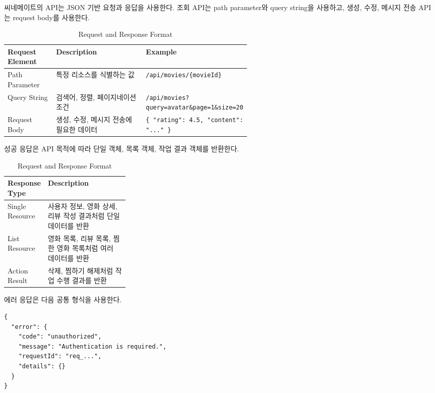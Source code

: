 \documentclass[11pt,a4paper]{article}
\renewcommand{\arraystretch}{1.18}
\begin{document}
씨네메이트의 API는 JSON 기반 요청과 응답을 사용한다. 조회 API는 path parameter와 query string을 사용하고, 생성, 수정, 메시지 전송 API는 request body를 사용한다.

\begin{table}[H]
\centering
\small
\setlength{\tabcolsep}{5pt}
\renewcommand{\arraystretch}{1.28}
\begin{tabularx}{\linewidth}{@{}>{\RaggedRight\arraybackslash}p{0.20\linewidth}>{\RaggedRight\arraybackslash}X>{\RaggedRight\arraybackslash}p{0.36\linewidth}@{}}
\toprule
\textbf{Request Element} & \textbf{Description} & \textbf{Example} \\
\midrule
Path Parameter & 특정 리소스를 식별하는 값 & \texttt{/\allowbreak{}api/\allowbreak{}movies/\allowbreak{}\{\allowbreak{}movieId\}\allowbreak{}} \\
Query String & 검색어, 정렬, 페이지네이션 조건 & \texttt{/\allowbreak{}api/\allowbreak{}movies?query=avatar\&page=1\&size=20} \\
Request Body & 생성, 수정, 메시지 전송에 필요한 데이터 & \texttt{\{\allowbreak{} "rating": 4.\allowbreak{}5, "content": ".\allowbreak{}.\allowbreak{}.\allowbreak{}" \}\allowbreak{}} \\
\bottomrule
\end{tabularx}
\caption{Request and Response Format}
\end{table}

성공 응답은 API 목적에 따라 단일 객체, 목록 객체, 작업 결과 객체를 반환한다.

\begin{table}[H]
\centering
\small
\setlength{\tabcolsep}{5pt}
\renewcommand{\arraystretch}{1.28}
\begin{tabularx}{\linewidth}{@{}>{\RaggedRight\arraybackslash}p{0.28\linewidth}>{\RaggedRight\arraybackslash}X@{}}
\toprule
\textbf{Response Type} & \textbf{Description} \\
\midrule
Single Resource & 사용자 정보, 영화 상세, 리뷰 작성 결과처럼 단일 데이터를 반환 \\
List Resource & 영화 목록, 리뷰 목록, 찜한 영화 목록처럼 여러 데이터를 반환 \\
Action Result & 삭제, 찜하기 해제처럼 작업 수행 결과를 반환 \\
\bottomrule
\end{tabularx}
\caption{Request and Response Format}
\end{table}

에러 응답은 다음 공통 형식을 사용한다.

\begin{verbatim}
{
  "error": {
    "code": "unauthorized",
    "message": "Authentication is required.",
    "requestId": "req_...",
    "details": {}
  }
}
\end{verbatim}
\end{document}
